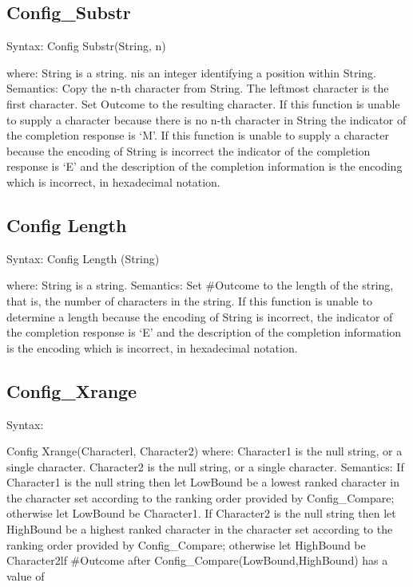 \subsection{Config\_Substr}\label{config_substr}

Syntax: Config Substr(String, n)

where: String is a string. nis an integer identifying a position within
String. Semantics: Copy the n-th character from String. The leftmost
character is the first character. Set Outcome to the resulting
character. If this function is unable to supply a character because
there is no n-th character in String the indicator of the completion
response is `M'. If this function is unable to supply a character
because the encoding of String is incorrect the indicator of the
completion response is `E' and the description of the completion
information is the encoding which is incorrect, in hexadecimal notation.

\subsection{Config Length}\label{config-length}

Syntax: Config Length (String)

where: String is a string. Semantics: Set \#Outcome to the length of the
string, that is, the number of characters in the string. If this
function is unable to determine a length because the encoding of String
is incorrect, the indicator of the completion response is `E' and the
description of the completion information is the encoding which is
incorrect, in hexadecimal notation.

\subsection{Config\_Xrange}\label{config_xrange}

Syntax:

Config Xrange(Characterl, Character2) where: Character1 is the null
string, or a single character. Character2 is the null string, or a
single character. Semantics: If Character1 is the null string then let
LowBound be a lowest ranked character in the character set according to
the ranking order provided by Config\_Compare; otherwise let LowBound be
Character1. If Character2 is the null string then let HighBound be a
highest ranked character in the character set according to the ranking
order provided by Config\_Compare; otherwise let HighBound be
Character2lf \#Outcome after Config\_Compare(LowBound,HighBound) has a
value of

